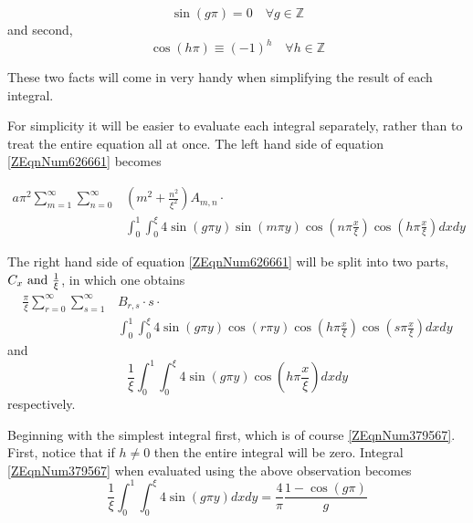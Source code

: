 \begin{equation} \label{3.7)} \sin (g\pi )=0 \quad \forall g\in {\mathbb Z}
\end{equation}
and second, 
\begin{equation} \label{ZEqnNum821421} \cos \left(h\pi \right)\equiv
\left(-1\right)^{h} \quad \forall h\in {\mathbb Z} \end{equation}

These two facts will come in very handy when simplifying the result of each
integral. 

For simplicity it will be easier to evaluate each integral separately, rather
than to treat the entire equation all at once. The left hand side of equation
\eqref{ZEqnNum626661} becomes

\begin{equation} \label{ZEqnNum923088} \begin{split} 
    a \pi ^{2} \sum _{m=1}^{\infty} \sum_{n=0}^{\infty} 
    & \left(m^{2} + \frac{n^{2}}{\xi ^{2}} \right) A_{m,n} \cdot \\
    & \int _{0}^{1} \int _{0}^{\xi} 4 \sin \left(g \pi y \right) 
    \sin \left(m\pi y\right) \cos \left(n \pi \frac{x}{\xi} \right)
    \cos \left(h \pi \frac{x}{\xi} \right) dxdy  
\end{split} \end{equation}

The right hand side of equation \eqref{ZEqnNum626661} will be split into two
parts, $C_{x} \text{ and } \frac{1}{\xi } $, in which one obtains
\begin{equation} \label{ZEqnNum851626} \begin{split}
    \frac{\pi}{\xi} \sum _{r=0}^{\infty} \sum _{s=1}^{\infty}  
    & B_{r,s} \cdot s \cdot \\
    & \int_{0}^{1} \int _{0}^{\xi } 4 \sin \left(g \pi y\right) 
    \cos (r\pi y)\cos \left(h\pi \frac{x}{\xi} \right)\cos
    \left(s\pi \frac{x}{\xi} \right) dxdy  
\end{split} \end{equation}
and
\begin{equation} \label{ZEqnNum379567} \frac{1}{\xi } \int _{0}^{1} \int
_{0}^{\xi }4\sin \left(g\pi y\right)\cos \left(h\pi \frac{x}{\xi } \right)dxdy
\end{equation}
respectively.

Beginning with the simplest integral first, which is of course
\eqref{ZEqnNum379567}. First, notice that if $h\ne 0$ then the entire integral
will be zero. Integral \eqref{ZEqnNum379567} when evaluated using the above
observation becomes
\begin{equation*}
    \frac{1}{\xi } \int _{0}^{1} \int _{0}^{\xi }4\sin \left(g\pi y\right)dxdy
    =\frac{4}{\pi } \frac{1-\cos \left(g\pi \right)}{g} 
\end{equation*}

